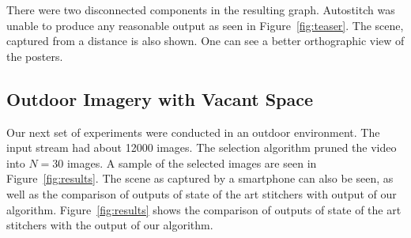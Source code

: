 There were two disconnected components in the resulting graph.
Autostitch was unable to produce any reasonable output as seen in
Figure~\ref{fig:teaser}.  The scene, captured from a distance is also
shown.  One can see a better orthographic view of the posters.

\subsection{Outdoor Imagery with Vacant Space}
Our next set of experiments were conducted in an outdoor
environment. The input stream had about 12000 images. The selection
algorithm pruned the video into $N=30$ images. A sample of the
selected images are seen in Figure~\ref{fig:results}.  The scene as
captured by a smartphone can also be seen, as well as the comparison
of outputs of state of the art stitchers with output of our
algorithm. Figure~\ref{fig:results} shows the comparison of outputs of
state of the art stitchers with the output of our algorithm.



